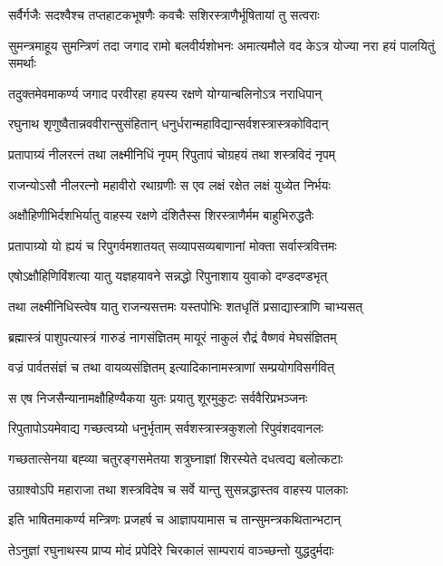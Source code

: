 \twolineshloka
{सर्वैर्गजैः सदश्वैश्च तप्तहाटकभूषणैः}
{कवचैः सशिरस्त्राणैर्भूषितायां तु सत्वराः}%


\twolineshloka
{सुमन्त्रमाहूय सुमन्त्रिणं तदा जगाद रामो बलवीर्यशोभनः}
{अमात्यमौले वद केऽत्र योज्या नरा हयं पालयितुं समर्थाः}%

\twolineshloka
{तदुक्तमेवमाकर्ण्य जगाद परवीरहा}
{हयस्य रक्षणे योग्यान्बलिनोऽत्र नराधिपान्}%

\twolineshloka
{रघुनाथ शृणुष्वैतान्नववीरान्सुसंहितान्}
{धनुर्धरान्महाविद्यान्सर्वशस्त्रास्त्रकोविदान्}%

\twolineshloka
{प्रतापाग्र्यं नीलरत्नं तथा लक्ष्मीनिधिं नृपम्}
{रिपुतापं चोग्रहयं तथा शस्त्रविदं नृपम्}%

\twolineshloka
{राजन्योऽसौ नीलरत्नो महावीरो रथाग्रणीः}
{स एव लक्षं रक्षेत लक्षं युध्येत निर्भयः}%

\twolineshloka
{अक्षौहिणीभिर्दशभिर्यातु वाहस्य रक्षणे}
{दंशितैस्स शिरस्त्राणैर्मम बाहुभिरुद्धतैः}%

\twolineshloka
{प्रतापाग्र्यो यो ह्ययं च रिपुगर्वमशातयत्}
{सव्यापसव्यबाणानां मोक्ता सर्वास्त्रवित्तमः}%

\twolineshloka
{एषोऽक्षौहिणिविंशत्या यातु यज्ञहयावने}
{सन्नद्धो रिपुनाशाय युवाको दण्डदण्डभृत्}%

\twolineshloka
{तथा लक्ष्मीनिधिस्त्वेष यातु राजन्यसत्तमः}
{यस्तपोभिः शतधृतिं प्रसाद्यास्त्राणि चाभ्यसत्}%

\twolineshloka
{ब्रह्मास्त्रं पाशुपत्यास्त्रं गारुडं नागसंज्ञितम्}
{मायूरं नाकुलं रौद्रं वैष्णवं मेघसंज्ञितम्}%

\twolineshloka
{वज्रं पार्वतसंज्ञं च तथा वायव्यसंज्ञितम्}
{इत्यादिकानामस्त्राणां सम्प्रयोगविसर्गवित्}%

\twolineshloka
{स एष निजसैन्यानामक्षौहिण्यैकया युतः}
{प्रयातु शूरमुकुटः सर्ववैरिप्रभञ्जनः}%

\twolineshloka
{रिपुतापोऽयमेवाद्य गच्छत्वग्र्यो धनुर्भृताम्}
{सर्वशस्त्रास्त्रकुशलो रिपुवंशदवानलः}%

\twolineshloka
{गच्छतात्सेनया बह्व्या चतुरङ्गसमेतया}
{शत्रुघ्नाज्ञां शिरस्येते दधत्वद्य बलोत्कटाः}%

\twolineshloka
{उग्राश्वोऽपि महाराजा तथा शस्त्रविदेष च}
{सर्वे यान्तु सुसन्नद्धास्तव वाहस्य पालकाः}%

\twolineshloka
{इति भाषितमाकर्ण्य मन्त्रिणः प्रजहर्ष च}
{आज्ञापयामास च तान्सुमन्त्रकथितान्भटान्}%

\twolineshloka
{तेऽनुज्ञां रघुनाथस्य प्राप्य मोदं प्रपेदिरे}
{चिरकालं साम्परायं वाञ्च्छन्तो युद्धदुर्मदाः}%

